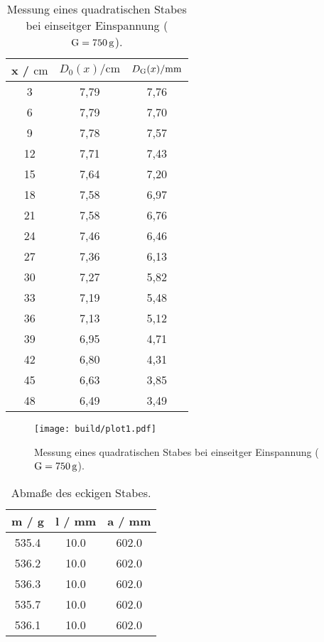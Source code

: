 \sloppy
\begin{table}[H]
  \centering
  \caption{Messung eines quadratischen Stabes bei einseitger Einspannung ($\text G = \SI{750}{\gram}$).}
  \label{tab:werte1}
  \begin{tabular}{c c c}
    \toprule
    x / $\si{\centi\meter} $ & $ D_0(x) / \si{\centi\meter}$ & $D_{\text G}(x) / \si{\milli\meter}$ \\
    \midrule
    3 & 7,79 & 7,76 \\
    6 & 7,79 & 7,70 \\
    9 & 7,78 & 7,57 \\
    12 & 7,71 & 7,43 \\
    15 & 7,64 & 7,20 \\
    18 & 7,58 & 6,97 \\
    21 & 7,58 & 6,76 \\
    24 & 7,46 & 6,46 \\
    27 & 7,36 & 6,13 \\
    30 & 7,27 & 5,82 \\
    33 & 7,19 & 5,48 \\
    36 & 7,13 & 5,12 \\
    39 & 6,95 & 4,71 \\
    42 & 6,80 & 4,31 \\
    45 & 6,63 & 3,85 \\
    48 & 6,49 & 3,49 \\
    \bottomrule
  \end{tabular}
\end{table}

\sloppy
\begin{figure}
  \centering
  \texttt{[image: build/plot1.pdf]}
  \caption{Messung eines quadratischen Stabes bei einseitger Einspannung ($\text G = \SI{750}{\gram}$).}
  \label{fig:plot1}
\end{figure}

\sloppy
\begin{table}[H]
  \centering
  \caption{Abmaße des eckigen Stabes.}
  \label{tab:eckigStab}
  \begin{tabular}{c c c}
    \toprule
    m / g & l / mm & a / mm \\
    \midrule
    535.4 & 10.0 & 602.0 \\
    536.2 & 10.0 & 602.0 \\
    536.3 & 10.0 & 602.0 \\
    535.7 & 10.0 & 602.0 \\
    536.1 & 10.0 & 602.0 \\
    \bottomrule
  \end{tabular}
\end{table}


